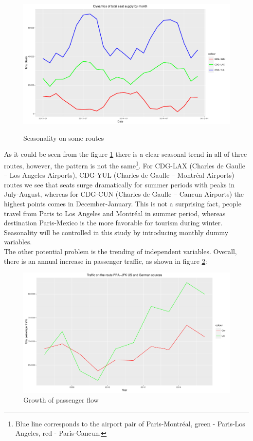 \documentclass[titlepage, 11pt]{article}
\begin{document}
\begin{figure}[ht]
\centering
\caption{Seasonality on some routes}
\includegraphics[width=120 mm]{Rplot07.pdf}
\label{season}
\end{figure}
\tab As it could be seen from the figure \ref{season} there is a clear seasonal trend in all of three routes, however, the pattern is not the same\footnote{Blue line corresponds to the airport pair of Paris-Montréal, green - Paris-Los Angeles, red - Paris-Cancun.}. For CDG-LAX (Charles de Gaulle -- Los Angeles Airports), CDG-YUL (Charles de Gaulle -- Montréal Airports) routes we see that seats surge dramatically for summer periods with peaks in July-August, whereas for CDG-CUN (Charles de Gaulle -- Cancun Airports) the highest points comes in December-January. This is not a surprising fact, people travel from Paris to Los Angeles and Montréal in summer period, whereas destination Paris-Mexico is the more favorable for tourism during winter. \\
\tab Seasonality will be controlled in this study by introducing monthly dummy variables\cite{Hsiao}. 
\\
\tab The other potential problem is the trending of independent variables. Overall, there is an annual increase in passenger traffic, as shown in figure \ref{traffic}: 
\begin{figure}[h!]
\centering
\caption{Growth of passenger flow}
\label{traffic}
\includegraphics[width=120 mm]{traffic1.pdf}
\end{figure}
\end{document}
